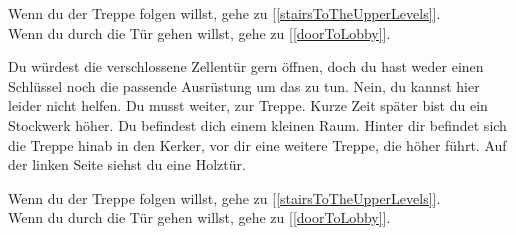 Wenn du der Treppe folgen willst, gehe zu [\ref{stairsToTheUpperLevels}].
\\Wenn du durch die Tür gehen willst, gehe zu [\ref{doorToLobby}].


Du würdest die verschlossene Zellentür gern öffnen, doch du hast weder einen Schlüssel noch die passende Ausrüstung um das zu tun. Nein, du kannst hier leider nicht helfen. Du musst weiter, zur Treppe. Kurze Zeit später bist du ein Stockwerk höher. Du befindest dich einem kleinen Raum. Hinter dir befindet sich die Treppe hinab in den Kerker, vor dir eine weitere Treppe, die höher führt. Auf der linken Seite siehst du eine Holztür.

Wenn du der Treppe folgen willst, gehe zu [\ref{stairsToTheUpperLevels}].
\\Wenn du durch die Tür gehen willst, gehe zu [\ref{doorToLobby}].
